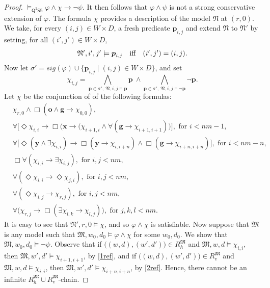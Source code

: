 \documentclass{lmcs} %
\theoremstyle{plain}\newtheorem{satz}[thm]{Satz} %
\newcommand{\sig}{\mathit{sig}}
\newcommand{\FOMS}{\ensuremath{\mathsf{Q^1S5}}}
\newcommand{\fform}[1]{\boldsymbol{#1}}
\newcommand{\pvar}{\fform{p}}
\newcommand{\gvar}{\fform{g}}
\newcommand{\xvar}{\fform{x}}
\newcommand{\yvar}{\fform{y}}
\newcommand{\ovar}{\fform{o}}
\newcommand{\Bv}{\forall}
\newcommand{\Bh}{\Box}
\newcommand{\Dv}{\exists}
\newcommand{\Dh}{\Diamond}
\begin{document}
\begin{proof}
		$\models_\FOMS\varphi\land\chi\to\neg\psi$.
		It then follows 
		that $\varphi \wedge \psi$ is not a strong conservative extension of $\varphi$. The formula $\chi$ provides a description of the model $\mathfrak{N}$ at $(r,0)$. We take, for every $(i,j)\in W\times D$, a fresh predicate $\pvar_{i,j}$ and extend $\mathfrak{N}$ to $\mathfrak{N}'$ by setting,
		for all $(i',j')\in W\times D$,	
		\begin{equation}
			\label{Mdesc2}
			\mbox{$\mathfrak N',i',j'\models \pvar_{i,j}$\quad iff\quad $(i',j')=(i,j)$.}
		\end{equation}
		Now let $\sigma'=\sig(\varphi) \cup \{\pvar_{i,j} \mid (i,j)\in W\times D\}$, and
		set
		\begin{equation}\label{Kdiagf}
			\chi_{i,j} = \bigwedge_{\pvar\in\sigma',\ \mathfrak N,i,j\models \pvar}\pvar\  \land
			\bigwedge_{\pvar\in\sigma',\ \mathfrak N,i,j\models \neg\pvar}\neg\pvar.
		\end{equation}
		Let $\chi$ be the conjunction of
		of the following formulas:
		\begin{align}
			\label{ref00}
			&\chi_{r,0}\land\Bh(\ovar\land\gvar\to\chi_{0,0}),\\
			\label{1ref}
			&\Bv \bigl[\Dh \chi_{i,i} \rightarrow \Bh \bigl(\xvar \rightarrow (\chi_{i+1,i} \wedge \Bv (\gvar \rightarrow \chi_{i+1,i+1})\bigr)\bigr],
			\text{ for $i<nm-1$}, \\
			\label{2ref}
			&\Bv \bigl[\Dh(\yvar\land\Dv \chi_{i,i}) \rightarrow \Bh(\yvar \rightarrow \chi_{i,i+n})\land\Bh(\gvar \rightarrow \chi_{i+n,i+n})\bigr], 
			\text{ for $i<nm-n$},\\
			\label{3refa}
			&\Bh\Bv (\chi_{i,i} \rightarrow \Dv \chi_{i,j}),\text{ for $i,j<nm$,}\\
			\label{3refb}
			&\Bv(\Dh\chi_{i,i} \rightarrow \Dh\chi_{j,i}),\text{ for $i,j<nm$,}\\		
			\label{3refc}
			&\Bv(\Dh\chi_{i,j} \rightarrow \chi_{r,j}),\text{ for $i,j<nm$},\\        
			\label{3ref}
			&\Bv \bigl(\chi_{r,j} \rightarrow \Bh( \Dv \chi_{l,k} \rightarrow \chi_{l,j})\bigr),\text{ for $j,k,l<nm$}.	
		\end{align}
		It is easy to see that
		$\mathfrak{N}',r,0\models \chi$, and so $\varphi \wedge \chi$ is satisfiable. 
		Now suppose that $\mathfrak{M}$ is any model such that $\mathfrak{M},w_0,d_0 \models \varphi\wedge\chi$ for some $w_0,d_0$. We show that $\mathfrak{M},w_0,d_0 \models\neg\psi$.
		Observe that if $\bigl((w,d),(w',d')\bigr)\in R_{h}^{\mathfrak{M}}$
		and $\mathfrak{M},w,d\models \chi_{i,i}$, then $\mathfrak{M},w',d'\models \chi_{i+1,i+1}$, by \eqref{1ref}, and if $\bigl((w,d),(w',d')\bigr)\in R_{v}^{\mathfrak{M}}$
		and $\mathfrak{M},w,d\models \chi_{i,i}$, then $\mathfrak{M},w',d'\models \chi_{i+n,i+n}$, by \eqref{2ref}. Hence, there cannot be an infinite $R_{h}^{\mathfrak{M}} \cup R_{v}^{\mathfrak{M}}$-chain. 
		

\end{proof}
\end{document}
